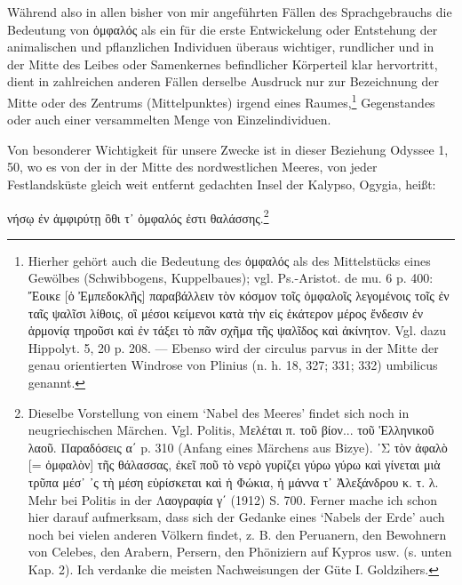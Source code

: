 \documentclass[a4paper, 11pt, oneside]{article}
\begin{document}
Während also in allen bisher von mir angeführten Fällen des Sprachgebrauchs die Bedeutung von ὀμφαλός als ein für die erste Entwickelung oder Entstehung der animalischen und pflanzlichen Individuen überaus wichtiger, rundlicher und in der Mitte des Leibes oder Samenkernes befindlicher Körperteil klar hervortritt, dient in zahlreichen anderen Fällen derselbe Ausdruck nur zur Bezeichnung der Mitte oder des Zentrums (Mittelpunktes) irgend eines Raumes,\footnote{Hierher gehört auch die Bedeutung des ὀμφαλός als des Mittelstücks eines Gewölbes (Schwibbogens, Kuppelbaues); vgl. Ps.-Aristot. de mu. 6 p. 400: Ἔοικε [ὁ Ἐμπεδοκλῆς] παραβάλλειν τὸν κόσμον τοῖς ὀμφαλοῖς λεγομένοις τοῖς ἐν ταῖς ψαλῖσι λίθοις, οἳ μέσοι κείμενοι κατὰ τὴν εἰς ἑκάτερον μέρος ἔνδεσιν ἐν ἁρμονίᾳ τηροῦσι καὶ ἐν τάξει τὸ πᾶν σχῆμα τῆς ψαλῖδος καὶ ἀκίνητον. Vgl. dazu Hippolyt. 5, 20 p. 208. --- Ebenso wird der circulus parvus in der Mitte der genau orientierten Windrose von Plinius (n. h. 18, 327; 331; 332) umbilicus genannt.} Gegenstandes oder auch einer versammelten Menge von Einzelindividuen.

Von besonderer Wichtigkeit für unsere Zwecke ist in dieser Beziehung Odyssee 1, 50, wo es von der in der Mitte des nordwestlichen Meeres, von jeder Festlandsküste gleich weit entfernt gedachten Insel der Kalypso, Ogygia, heißt:

νήσῳ ἐν ἀμφιρύτῃ ὃθι τ᾽ ὀμφαλός ἐστι θαλάσσης.\footnote{Dieselbe Vorstellung von einem `Nabel des Meeres' findet sich noch in neugriechischen Märchen. Vgl. Politis, Μελέται π. τοῦ βίον... τοῦ Ἑλληνικοῦ λαοῦ. Παραδόσεις α΄ p. 310 (Anfang eines Märchens aus Bizye). ᾽Σ τὸν ἀφαλὸ [= ὀμφαλὸν] τῆς θάλασσας, ἐκεῖ ποῦ τὸ νερὸ γυρίζει γύρω γύρω καὶ γίνεται μιὰ τρῦπα μέσ᾽ ᾿ς τὴ μέση εὑρίσκεται καὶ ἡ Φώκια, ἡ μάννα τ᾿ Ἀλεξάνδρου κ. τ. λ. Mehr bei Politis in der Λαογραφία γ΄ (1912) S. 700. Ferner mache ich schon hier darauf aufmerksam, dass sich der Gedanke eines `Nabels der Erde' auch noch bei vielen anderen Völkern findet, z. B. den Peruanern, den Bewohnern von Celebes, den Arabern, Persern, den Phöniziern auf Kypros usw. (s. unten Kap. 2). Ich verdanke die meisten Nachweisungen der Güte I. Goldzihers.}
\end{document}
